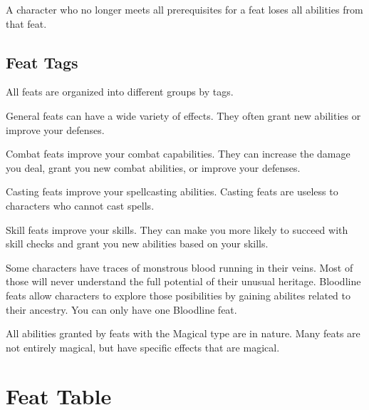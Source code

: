         A character who no longer meets all prerequisites for a feat loses all abilities from that feat.

    \subsection{Feat Tags}
        All feats are organized into different groups by tags.

         General feats can have a wide variety of effects.
        They often grant new abilities or improve your defenses.

         Combat feats improve your combat capabilities.
        They can increase the damage you deal, grant you new combat abilities, or improve your defenses.

         Casting feats improve your spellcasting abilities.
        Casting feats are useless to characters who cannot cast spells.

         Skill feats improve your skills.
        They can make you more likely to succeed with skill checks and grant you new abilities based on your skills.

         Some characters have traces of monstrous blood running in their veins.
        Most of those will never understand the full potential of their unusual heritage.
        Bloodline feats allow characters to explore those posibilities by gaining abilites related to their ancestry.
        You can only have one Bloodline feat.

        All abilities granted by feats with the Magical type are  in nature.
        Many feats are not entirely magical, but have specific effects that are magical.

\section{Feat Table}

